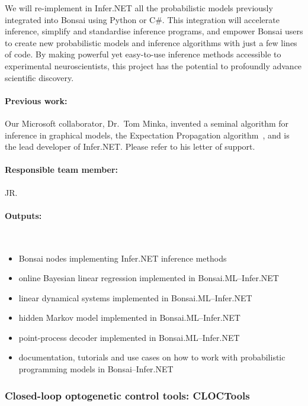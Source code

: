 We will re-implement in Infer.NET all the probabilistic models previously
integrated into Bonsai using Python or C\#. This integration will accelerate
inference, simplify and standardise inference programs, and empower Bonsai
users to create new probabilistic models and inference algorithms with just a
few lines of code. By making powerful yet easy-to-use inference methods
accessible to experimental neuroscientists, this project has the potential to
profoundly advance scientific discovery.

\paragraph{Previous work:} Our Microsoft collaborator, Dr.~Tom Minka, invented
a seminal algorithm for inference in graphical models, the Expectation
Propagation algorithm~\citep{minka01}, and is the lead developer of Infer.NET.
Please refer to his letter of support.

\paragraph{Responsible team member:} JR.

\paragraph{Outputs:}\mbox{}\\

\begin{itemize}

    \item Bonsai nodes implementing Infer.NET inference methods
    \item online Bayesian linear regression implemented in Bonsai.ML--Infer.NET
    \item linear dynamical systems implemented in Bonsai.ML--Infer.NET
    \item hidden Markov model implemented in Bonsai.ML--Infer.NET
    \item point-process decoder implemented in Bonsai.ML--Infer.NET
    \item documentation, tutorials and use cases on how to work with
probabilistic programming models in Bonsai--Infer.NET \end{itemize}

\subsubsection*{Closed-loop optogenetic control tools: CLOCTools}

